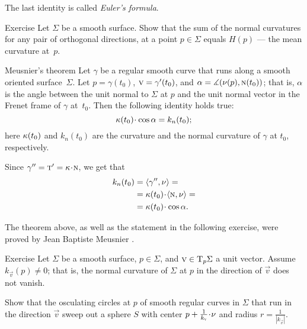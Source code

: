 The last identity is called \emph{Euler's formula}.

\begin{thm}{Exercise}\label{ex:mean-curvature}
Let $\Sigma$ be a smooth surface.
Show that the sum of the normal curvatures for any pair of orthogonal directions, at a point $p\in\Sigma$ equals $H(p)$ --- the mean curvature at~$p$. 
\end{thm}




\begin{thm}{Meusnier's theorem}
\label{thm:meusnier}
Let $\gamma$ be a regular smooth curve that runs along a smooth oriented surface~$\Sigma$.
Let $p=\gamma(t_0)$, ${\vec v}\z=\gamma'(t_0)$, and $\alpha\z=\measuredangle(\Norm(p),\norm(t_0))$;
that is, $\alpha$ is the angle between the unit normal to $\Sigma$ at $p$ and the unit normal vector in the Frenet frame of $\gamma$ at~$t_0$.
Then the following identity holds true: 
\[\kur(t_0)\cdot\cos\alpha=k_{n}(t_0);\]
here $\kappa(t_0)$ and $k_n(t_0)$ are the curvature and the normal curvature of $\gamma$ at $t_0$, respectively. 
\end{thm}


 Since $\gamma''=\tan'=\kur\cdot \norm$, we get that
\begin{align*}
k_{n}(t_0)&=\langle\gamma'',\Norm\rangle=
\\
&=\kur(t_0)\cdot\langle\norm,\Norm\rangle=
\\
&=\kur(t_0)\cdot\cos\alpha.
\end{align*}
\qedsf

The theorem above, as well as the statement in the following exercise, were proved by Jean Baptiste Meusnier \cite{meusnier}.

\begin{thm}{Exercise}\label{ex:meusnier}
Let $\Sigma$ be a smooth surface, $p\in\Sigma$, and ${\text{\sc{v}}}\in \mathrm{T}_p\Sigma$ a unit vector.
Assume $k_{\vec v}(p)\ne 0$; that is, the normal curvature of $\Sigma$ at $p$ in the direction of ${\vec v}$ does not vanish.

Show that the osculating circles at $p$ of smooth regular curves in $\Sigma$ that run in the direction ${\vec v}$ sweep out a sphere $S$ with center $p+\tfrac1{k_{\vec v}}\cdot\Norm$ and radius $r=\tfrac1{|k_{\vec v}|}$.
\end{thm}

